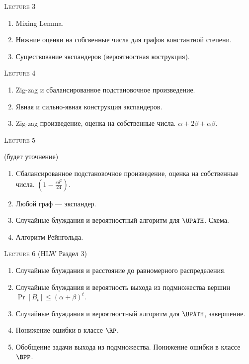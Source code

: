 \centerline{\textsc{Lecture 3} }

\begin{enumerate}
    \item Mixing Lemma. 
    \item Нижние оценки на собсвенные числа для графов константной степени. 
    \item Существование экспандеров (вероятностная кострукция). 
\end{enumerate}

\centerline{\textsc{Lecture 4} }

\begin{enumerate}
    \item Zig-zag и сбалансированное подстановочное произведение. 
    \item Явная и сильно-явная конструкция экспандеров. 
    \item Zig-zag произведение, оценка на собственные числа. $\alpha + 2 \beta + \alpha \beta$. 
\end{enumerate}

\centerline{\textsc{Lecture 5 }} (будет уточнение)

\begin{enumerate}
    \item Cбалансированное подстановочное произведение, оценка на собственные числа. $\left(1 -
        \frac{\varepsilon \delta^2}{24}\right)$. 
    \item Любой граф --- экспандер.         
    \item Случайные блуждания и вероятностный алгоритм для $\UPATH$. Схема. 
    \item Алгоритм Рейнгольда.
\end{enumerate}


\centerline{\textsc{Lecture 6} (HLW Раздел 3)}

\begin{enumerate}
    \item Случайные блуждания и расстояние до равномерного распределения.
    \item Случайные блуждания и вероятность выхода из подмножества вершин $\Pr[B_t] \le (\alpha +
        \beta)^t$.
    \item Случайные блуждания и вероятностный алгоритм для $\UPATH$, завершение.
    \item Понижение ошибки в классе $\RP$.
    \item Обобщение задачи выхода из подмножества. Понижение ошибки в классе $\BPP$.
\end{enumerate}



